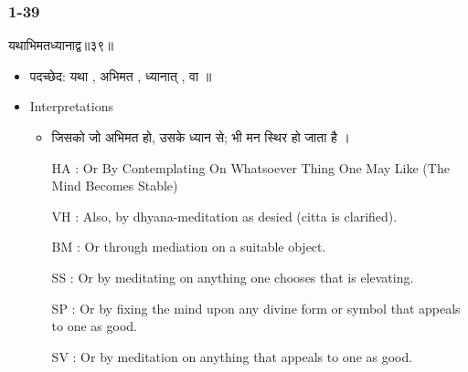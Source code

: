 \begin{frame}[fragile]\frametitle{1-39}
\begin{sanskrit}
यथाभिमतध्यानाद्व॥३९॥
\end{sanskrit}

	\begin{itemize}
	\item पदच्छेद: यथा , अभिमत , ध्यानात् , वा ॥
	\item Interpretations
		\begin{itemize}	
		\item जिसको जो अभिमत हो, उसके ध्यान से; भी मन स्थिर हो जाता है ।
		\item [HA]: Or By Contemplating On Whatsoever Thing One May Like (The Mind Becomes Stable)
		\item [VH]: Also, by dhyana-meditation as desied (citta is clarified).
		\item [BM]: Or through mediation on a suitable object.
		\item [SS]: Or by meditating on anything one chooses that is elevating.
		\item [SP]: Or by fixing the mind upon any divine form or symbol that appeals to one as good.
		\item [SV]: Or by meditation on anything that appeals to one as good. 
		\end{itemize}
	\end{itemize}
	
\end{frame}




